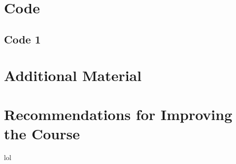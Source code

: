 \documentclass[]{book}
\begin{document}
\pagebreak

\appendix


\chapter{Code}
\section{Code 1}

\chapter{Additional Material}
















\begin{landscape}

\end{landscape}
\chapter{Recommendations for Improving the Course}
lol
\end{document}
